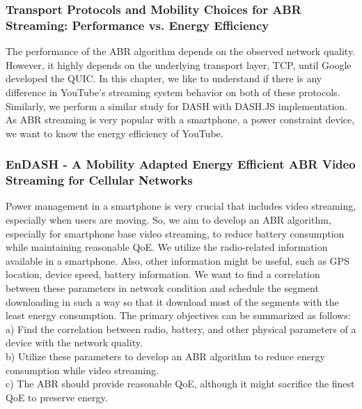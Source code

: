 \subsubsection{Transport Protocols and Mobility Choices for ABR Streaming: Performance vs. Energy Efficiency}
The performance of the ABR algorithm depends on the observed network quality. However, it highly depends on the underlying transport layer, TCP, until Google developed the QUIC. In this chapter, we like to understand if there is any difference in YouTube's streaming system behavior on both of these protocols. Similarly, we perform a similar study for DASH with DASH.JS implementation. As ABR streaming is very popular with a smartphone, a power constraint device, we want to know the energy efficiency of YouTube.

\subsubsection{EnDASH - A Mobility Adapted Energy
	Efficient ABR Video Streaming for
	Cellular Networks}
Power management in a smartphone is very crucial that includes video streaming, especially when users are moving. So, we aim to develop an ABR algorithm, especially for smartphone base video streaming, to reduce battery consumption while maintaining reasonable QoE. We utilize the radio-related information available in a smartphone. Also, other information might be useful, such as GPS location, device speed, battery information. We want to find a correlation between these parameters in network condition and schedule the segment downloading in such a way so that it download most of the segments with the least energy consumption. The primary objectives can be summarized as follows:\\
a) Find the correlation between radio, battery, and other physical parameters of a device with the network quality.\\
b) Utilize these parameters to develop an ABR algorithm to reduce energy consumption while video streaming.\\
c) The ABR should provide reasonable QoE, although it might sacrifice the finest QoE to preserve energy.


